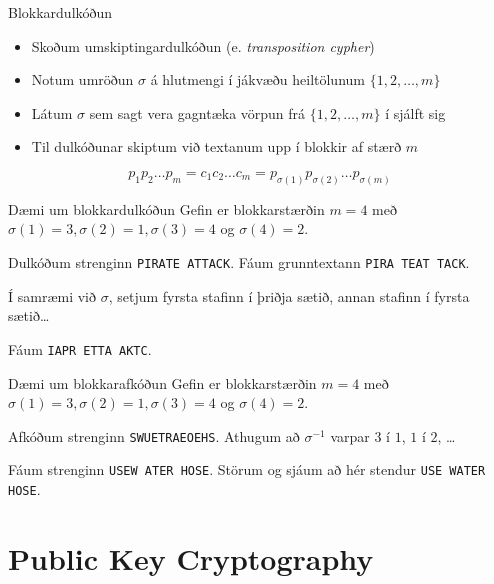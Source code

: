 \documentclass[handout]{beamer}
\begin{document}
\begin{frame}{Blokkardulkóðun}
\begin{itemize}
 \item Skoðum umskiptingardulkóðun (e. \emph{transposition cypher})
 \item Notum umröðun $\sigma$ á hlutmengi í jákvæðu heiltölunum $\{1, 2, \ldots, m\}$
 \item Látum $\sigma$ sem sagt vera gagntæka vörpun frá $\{1, 2, \ldots, m\}$ í sjálft sig
 \item Til dulkóðunar skiptum við textanum upp í blokkir af stærð $m$
\end{itemize}
\[
 p_1p_2\ldots p_m = c_1c_2\ldots c_m = p_{\sigma(1)}p_{\sigma(2)}\ldots p_{\sigma(m)}
\]

\end{frame}

\begin{frame}{Dæmi um blokkardulkóðun}
Gefin er blokkarstærðin $m=4$ með $\sigma(1) = 3, \sigma(2) = 1, \sigma(3) = 4$ og $\sigma(4) = 2$.

Dulkóðum strenginn \texttt{PIRATE ATTACK}. Fáum grunntextann \texttt{PIRA TEAT TACK}.

Í samræmi við $\sigma$, setjum fyrsta stafinn í þriðja sætið, annan stafinn í fyrsta sætið\ldots

Fáum \texttt{IAPR ETTA AKTC}.
\end{frame}

\begin{frame}{Dæmi um blokkarafkóðun}
Gefin er blokkarstærðin $m=4$ með $\sigma(1) = 3, \sigma(2) = 1, \sigma(3) = 4$ og $\sigma(4) = 2$.

Afkóðum strenginn \texttt{SWUETRAEOEHS}. Athugum að $\sigma^{-1}$ varpar $3$ í $1$, $1$ í $2$, \ldots

Fáum strenginn \texttt{USEW ATER HOSE}. Störum og sjáum að hér stendur \texttt{USE WATER HOSE}.
\end{frame}

\section{Public Key Cryptography}
\end{document}
